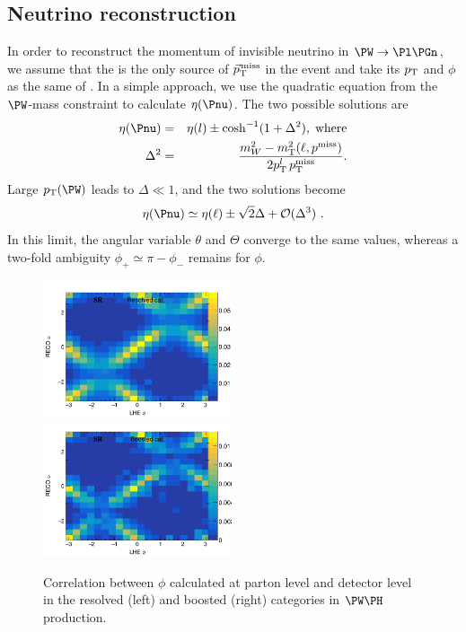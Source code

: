 \documentclass[a4paper,11pt]{article}
\begin{document}
\subsection{Neutrino reconstruction}
\label{sec:neu_reco}

In order to reconstruct the momentum of invisible neutrino in $\PW \to \Pl \Pgn$, we assume that the \Pnu is the only source of ${\vec p}_{\mathrm{T}}^{\kern1pt\text{miss}}$ in the event and take its $p_{\mathrm{T}}$ and $\phi$ as the same of \Pnu. 
In a simple approach, we use the quadratic equation from the $\PW$-mass constraint to calculate $\eta(\Pnu)$. 
The two possible solutions are
\begin{eqnarray}
\eta(\Pnu) &=& {\eta}(l) \pm \cosh^{-1}(1+{\Delta}^2),\;\textrm{where}\label{Eq:NeuEta}\\
{\Delta}^2 &=& \frac{m_W^2 - m_\textrm{T}^2 (\ell,{p^\text{miss}\xspace})}{2 p_\textrm{T}^{l}\, p_\textrm{T}^\textrm{miss}}. 
\end{eqnarray}
Large $\pt(\PW)$ leads to $\Delta \ll 1$, and the two solutions become 
\begin{equation}
{\eta}(\Pnu) \simeq {\eta}(\ell) \pm \sqrt{2}{\Delta} + {\cal{O}} ({\Delta}^3)	\ .
\label{Eq:NeuEta2}
\end{equation}
In this limit,  the angular variable $\theta$ and $\Theta$ converge to the same values, whereas a two-fold ambiguity  $\phi_{+} \simeq \pi - \phi_{-}$ remains for $\phi$. 
\begin{figure}[hbtp]
\begin{center}
\includegraphics[width=0.495\textwidth]{Figures/RECO/Resolved_Plot_2D_phi_unweighted.png}
\includegraphics[width=0.495\textwidth]{Figures/RECO/Boosted_Plot_2D_phi_unweighted.png}
\end{center}
\caption{
Correlation between $\phi$ calculated at parton level and detector level in the resolved (left) and boosted (right) categories in $\PW\PH$ production.
}
\label{fig:neureco}
\end{figure}
\end{document}
